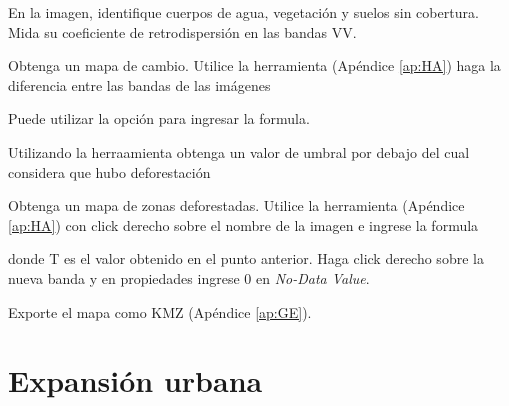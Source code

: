 \begin{que}
    En la imagen, identifique cuerpos de agua, vegetación y suelos sin cobertura. Mida su coeficiente de retrodispersión en las bandas VV.
\end{que}

\begin{que}
    Obtenga un mapa de cambio. Utilice la herramienta  (Apéndice \ref{ap:HA}) haga la diferencia entre las bandas de las imágenes
    \begin{center}
    \end{center}
    Puede utilizar la opción  para ingresar la formula.
\end{que}


\begin{que}
    Utilizando la herraamienta  obtenga un valor de umbral por debajo del cual considera que hubo deforestación
\end{que}

\begin{que}
    Obtenga un mapa de zonas deforestadas. Utilice la herramienta  (Apéndice \ref{ap:HA}) con click derecho sobre el nombre de la imagen e ingrese la formula
    \begin{center}
    \end{center}
    donde T es el valor obtenido en el punto anterior. Haga click derecho sobre la nueva banda y en propiedades ingrese 0 en \emph{No-Data Value}.
\end{que}

\begin{que}
    Exporte el mapa como KMZ (Apéndice \ref{ap:GE}).
\end{que}


\section{Expansión urbana}

